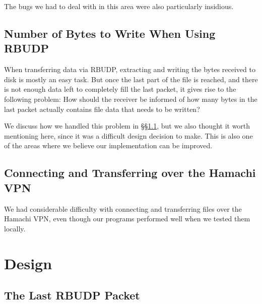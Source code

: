 \documentclass[10pt, a4paper]{article}
\begin{document}
The bugs we had to deal with in this area were also particularly insidious.

\subsection{Number of Bytes to Write When Using RBUDP}
\label{subsec:num-bytes-to-write}

When transferring data via RBUDP, extracting and writing the bytes received to
disk is mostly an easy task. But once the last part of the file is reached, and
there is not enough data left to completely fill the last packet, it gives rise
to the following problem: How should the receiver be informed of how many bytes
in the last packet actually contains file data that needs to be written?

We discuss how we handled this problem in \S\S\ref{subsec:last-packet}, but we
also thought it worth mentioning here, since it was a difficult design decision
to make. This is also one of the areas where we believe our implementation can
be improved.

\subsection{Connecting and Transferring over the Hamachi VPN}
\label{subsec:connect-transfer-hamachi}

We had considerable difficulty with connecting and transferring files over the
Hamachi VPN, even though our programs performed well when we tested them
locally.


\section{Design}
\label{sec:design}

\subsection{The Last RBUDP Packet}
\label{subsec:last-packet}
\end{document}
